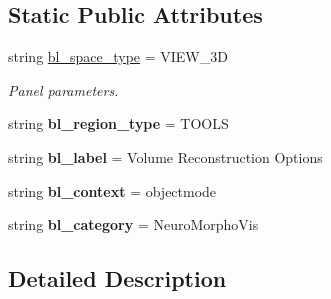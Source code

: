 \subsection*{Static Public Attributes}
\begin{DoxyCompactItemize}
\item 
string \hyperlink{classui__volume__panel_1_1VolumeOptions_aaf7dbab655271d9dcfd14b6c4ec2d385}{bl\+\_\+space\+\_\+type} = \textquotesingle{}V\+I\+E\+W\+\_\+3D\textquotesingle{}\hypertarget{classui__volume__panel_1_1VolumeOptions_aaf7dbab655271d9dcfd14b6c4ec2d385}{}\label{classui__volume__panel_1_1VolumeOptions_aaf7dbab655271d9dcfd14b6c4ec2d385}

\begin{DoxyCompactList}\small\item\em Panel parameters. \end{DoxyCompactList}\item 
string {\bfseries bl\+\_\+region\+\_\+type} = \textquotesingle{}T\+O\+O\+LS\textquotesingle{}\hypertarget{classui__volume__panel_1_1VolumeOptions_aa73fd50ec479a821db1ded6cb20912b5}{}\label{classui__volume__panel_1_1VolumeOptions_aa73fd50ec479a821db1ded6cb20912b5}

\item 
string {\bfseries bl\+\_\+label} = \textquotesingle{}Volume Reconstruction Options\textquotesingle{}\hypertarget{classui__volume__panel_1_1VolumeOptions_a1e669827d9b9ef92d5be18b1924bfc44}{}\label{classui__volume__panel_1_1VolumeOptions_a1e669827d9b9ef92d5be18b1924bfc44}

\item 
string {\bfseries bl\+\_\+context} = \textquotesingle{}objectmode\textquotesingle{}\hypertarget{classui__volume__panel_1_1VolumeOptions_ad2ad8ffc41f2409d08e287cf1b05c836}{}\label{classui__volume__panel_1_1VolumeOptions_ad2ad8ffc41f2409d08e287cf1b05c836}

\item 
string {\bfseries bl\+\_\+category} = \textquotesingle{}Neuro\+Morpho\+Vis\textquotesingle{}\hypertarget{classui__volume__panel_1_1VolumeOptions_a361b6bb2af25ece7e8b0464a2749e30f}{}\label{classui__volume__panel_1_1VolumeOptions_a361b6bb2af25ece7e8b0464a2749e30f}

\end{DoxyCompactItemize}


\subsection{Detailed Description}


